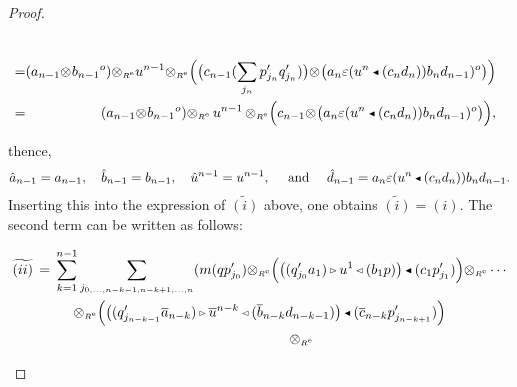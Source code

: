 \documentclass[reqno, a4paper, 10pt]{amsart}
\numberwithin{equation}{section}
\theoremstyle{plain}
\theoremstyle{definition}
\theoremstyle{remark}
\begin{document}
\begin{proof}
\begin{footnotesize}
\begin{eqnarray*}
\nonumber\\ 
&\!\!\!\!\!\!=&\!\!\!\!\!\! 
({a}_{n-1}{\otimes_{\scriptscriptstyle{{}}}}{b}_{n-1}{}^o){\otimes_{\scriptscriptstyle{{\scriptscriptstyle{{R^{\rm e}}}}}}}{u}^{n-1}   {\otimes_{\scriptscriptstyle{{\scriptscriptstyle{{R^{\rm e}}}}}}}\Big(\big( c_{n-1}(\sum_{ j_n} p_{j_n}'q_{j_n}') \big){\otimes_{\scriptscriptstyle{{}}}}{\big( {a_n \varepsilon(u^n{{\,\raise1pt\hbox{$\scriptscriptstyle{\blacktriangleleft}$} \, }} (c_nd_n)) b_n d_{n-1}){}^o} \big)} \Big) \nonumber \\ 
&\!\!\!\!\!\!= &\!\!\!\!\!\!
({a}_{n-1}{\otimes_{\scriptscriptstyle{{}}}}{b}_{n-1}{}^o){\otimes_{\scriptscriptstyle{{\scriptscriptstyle{{R^{\rm e}}}}}}}\, {u}^{n-1}  \, {\otimes_{\scriptscriptstyle{{\scriptscriptstyle{{R^{\rm e}}}}}}} \Big(c_{n-1}{\otimes_{\scriptscriptstyle{{}}}}{\big( {a_n \varepsilon(u^n{{\,\raise1pt\hbox{$\scriptscriptstyle{\blacktriangleleft}$} \, }} (c_nd_n)) b_n d_{n-1}){}^o} \big)}\Big),
 \label{Eq:T1}
\end{eqnarray*}
\end{footnotesize}
thence, 
$$ 
\hat{a}_{n-1}=a_{n-1},\quad \hat{b}_{n-1}= {b}_{n-1}, \quad \hat{u}^{n-1}=u^{n-1},\quad \text{ and } \quad \hat{d}_{n-1}=a_n \varepsilon(u^n{{\,\raise1pt\hbox{$\scriptscriptstyle{\blacktriangleleft}$} \, }} (c_nd_n)) b_n d_{n-1}.
$$
Inserting this into the expression of $\widetilde{(i)}$ above, one obtains $\widetilde{(i)}=(i)$.
The second term can be written as follows:
\begin{footnotesize}
\begin{multline*} 
\widetilde{(ii)} \,=\, \sum_{k=1}^{n-1}\underset{j_{0,\ldots,{n-k-1},{n-k+1},\ldots,{n}}}{\sum}(m(qp_{j_0}'){\otimes_{\scriptscriptstyle{{\scriptscriptstyle{{R^{\rm e}}}}}}}\Big( {\big( {(q_{j_0}'a_1){{\,\raise1pt\hbox{$\scriptscriptstyle{\rhd}$} \, }} u^1{{\,\raise1pt\hbox{$\scriptscriptstyle{\lhd}$} \, }}(b_1p)} \big)}{{\,\raise1pt\hbox{$\scriptscriptstyle{\blacktriangleleft}$} \, }} (c_1p_{j_1}')\Big)   {\otimes_{\scriptscriptstyle{{\scriptscriptstyle{{R^{\rm e}}}}}}}\cdots \\ {\otimes_{\scriptscriptstyle{{\scriptscriptstyle{{R^{\rm e}}}}}}} 
 \Big( {\big( {(q_{j_{n-k-1}}'{\overline{{a}}}_{n-k}){{\,\raise1pt\hbox{$\scriptscriptstyle{\rhd}$} \, }} {\overline{{u}}}^{n-k} {{\,\raise1pt\hbox{$\scriptscriptstyle{\lhd}$} \, }} ({\overline{{b}}}_{n-k}d_{n-k-1})} \big)}{{\,\raise1pt\hbox{$\scriptscriptstyle{\blacktriangleleft}$} \, }} ({\overline{{c}}}_{n-k}p_{j_{n-k+1}}')\Big) \\   \qquad \qquad \qquad {\otimes_{\scriptscriptstyle{{\scriptscriptstyle{{R^{\rm e}}}}}}}

\end{multline*}
\end{footnotesize}
\end{proof}
\end{document}
